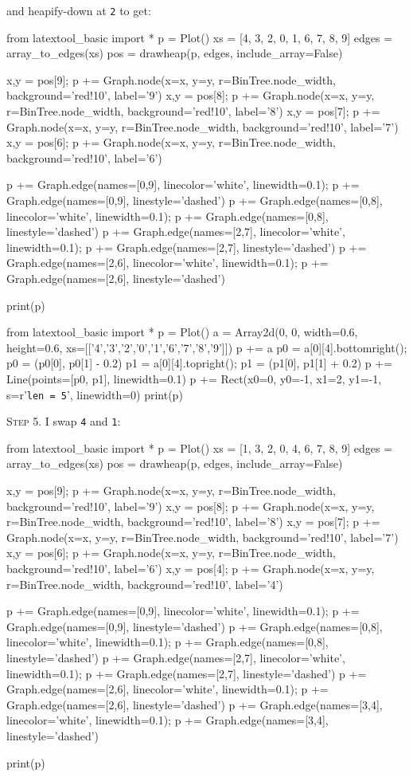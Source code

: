 and heapify-down at \texttt{2} to get:

\begin{python}
from latextool_basic import *
p = Plot()
xs = [4, 3, 2, 0, 1, 6, 7, 8, 9]
edges = array_to_edges(xs)
pos = drawheap(p, edges, include_array=False)

x,y = pos[9]; p += Graph.node(x=x, y=y, r=BinTree.node_width, background='red!10', label='9')
x,y = pos[8]; p += Graph.node(x=x, y=y, r=BinTree.node_width, background='red!10', label='8')
x,y = pos[7]; p += Graph.node(x=x, y=y, r=BinTree.node_width, background='red!10', label='7')
x,y = pos[6]; p += Graph.node(x=x, y=y, r=BinTree.node_width, background='red!10', label='6')

p += Graph.edge(names=[0,9], linecolor='white', linewidth=0.1); p += Graph.edge(names=[0,9], linestyle='dashed')
p += Graph.edge(names=[0,8], linecolor='white', linewidth=0.1); p += Graph.edge(names=[0,8], linestyle='dashed')
p += Graph.edge(names=[2,7], linecolor='white', linewidth=0.1); p += Graph.edge(names=[2,7], linestyle='dashed')
p += Graph.edge(names=[2,6], linecolor='white', linewidth=0.1); p += Graph.edge(names=[2,6], linestyle='dashed')

print(p)
\end{python}
\begin{python}
from latextool_basic import *
p = Plot()
a = Array2d(0, 0, width=0.6, height=0.6, 
             xs=[['4','3','2','0','1','6','7','8','9']])
p += a
p0 = a[0][4].bottomright(); p0 = (p0[0], p0[1] - 0.2)
p1 = a[0][4].topright(); p1 = (p1[0], p1[1] + 0.2)
p += Line(points=[p0, p1], linewidth=0.1)
p += Rect(x0=0, y0=-1, x1=2, y1=-1, s=r'\texttt{len = 5}', linewidth=0) 
print(p)
\end{python}


\textsc{Step 5}.
I swap \texttt{4} and \texttt{1}:

\begin{python}
from latextool_basic import *
p = Plot()
xs = [1, 3, 2, 0, 4, 6, 7, 8, 9]
edges = array_to_edges(xs)
pos = drawheap(p, edges, include_array=False)

x,y = pos[9]; p += Graph.node(x=x, y=y, r=BinTree.node_width, background='red!10', label='9')
x,y = pos[8]; p += Graph.node(x=x, y=y, r=BinTree.node_width, background='red!10', label='8')
x,y = pos[7]; p += Graph.node(x=x, y=y, r=BinTree.node_width, background='red!10', label='7')
x,y = pos[6]; p += Graph.node(x=x, y=y, r=BinTree.node_width, background='red!10', label='6')
x,y = pos[4]; p += Graph.node(x=x, y=y, r=BinTree.node_width, background='red!10', label='4')

p += Graph.edge(names=[0,9], linecolor='white', linewidth=0.1); p += Graph.edge(names=[0,9], linestyle='dashed')
p += Graph.edge(names=[0,8], linecolor='white', linewidth=0.1); p += Graph.edge(names=[0,8], linestyle='dashed')
p += Graph.edge(names=[2,7], linecolor='white', linewidth=0.1); p += Graph.edge(names=[2,7], linestyle='dashed')
p += Graph.edge(names=[2,6], linecolor='white', linewidth=0.1); p += Graph.edge(names=[2,6], linestyle='dashed')
p += Graph.edge(names=[3,4], linecolor='white', linewidth=0.1); p += Graph.edge(names=[3,4], linestyle='dashed')

print(p)
\end{python}

